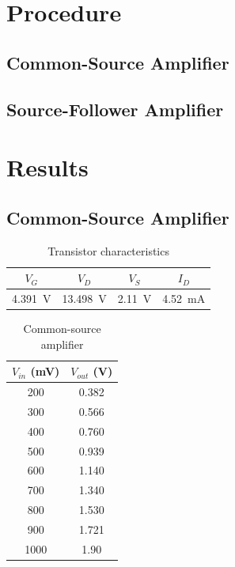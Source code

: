 \section{Procedure}
\label{sec:procedure}

\subsection{Common-Source Amplifier}

\subsection{Source-Follower Amplifier}

\section{Results}

\subsection{Common-Source Amplifier}

\begin{table}[hbtp]
  \centering
  \begin{tabular}{cccc}
    $V_G$ & $V_D$ & $V_S$ & $I_D$ \\
    \hline
    \SI{4.391}{V} & \SI{13.498}{V} & \SI{2.11}{V} & \SI{4.52}{mA} \\
  \end{tabular}
  \caption{\label{tab:tran_common} Transistor characteristics}
\end{table}

\begin{table}[hbtp]
  \centering
  \begin{tabular}{cc}
    $V_{in}$ (\si{mV}) & $V_{out}$ (\si{V}) \\
    \hline
    200          & 0.382         \\
    300          & 0.566         \\
    400          & 0.760         \\
    500          & 0.939         \\
    600          & 1.140         \\
    700          & 1.340         \\
    800          & 1.530         \\
    900          & 1.721         \\
    1000         & 1.90          \\
  \end{tabular}
  \caption{\label{tab:common-source} Common-source amplifier}
\end{table}


